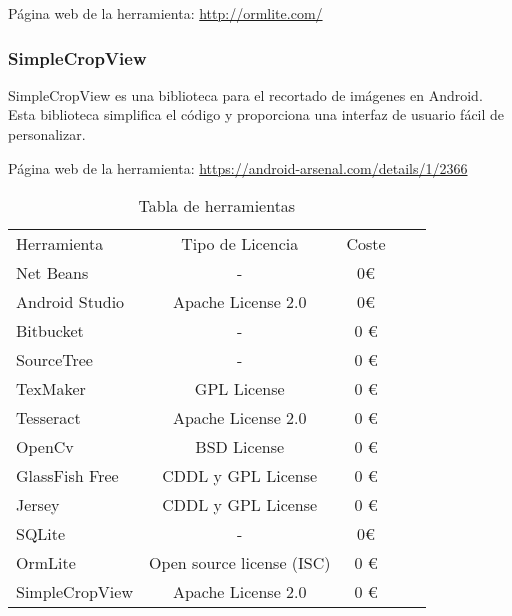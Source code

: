 Página web de la herramienta: \url{http://ormlite.com/}

\subsubsection{SimpleCropView}

SimpleCropView es una biblioteca para el recortado de  imágenes en Android.
Esta biblioteca simplifica el código y proporciona una interfaz de usuario fácil de personalizar.

Página web de la herramienta: \url{https://android-arsenal.com/details/1/2366} 

\begin{table}[htb]
\centering
\begin{tabular}{l c c c c}
\toprule
    Herramienta    & Tipo de Licencia          & Coste \\
    \otoprule
Net Beans      &            -                & 0\euro       \\
Android Studio & Apache License 2.0        & 0\euro      \\
Bitbucket      & -                         & 0 \euro     \\
SourceTree     & -                         & 0 \euro     \\
TexMaker       & GPL License               & 0 \euro    \\
Tesseract      & Apache License 2.0        & 0 \euro      \\
OpenCv         & BSD License               & 0 \euro      \\
GlassFish Free & CDDL y GPL License        & 0 \euro      \\
Jersey         & CDDL y GPL License        & 0 \euro      \\
SQLite         & -                         & 0\euro    \\
OrmLite        & Open source license (ISC) & 0 \euro     \\
SimpleCropView & Apache License 2.0        & 0 \euro   \\
\bottomrule 
\end{tabular}
\label{tabla:herramientas}
\caption{Tabla de herramientas}
\end{table}
